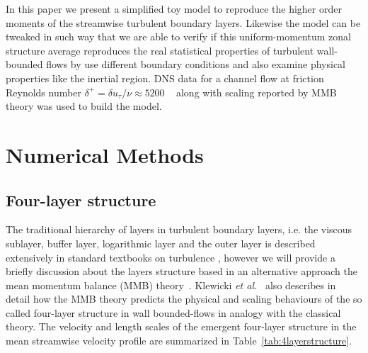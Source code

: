 \documentclass[aps,reprint,amsmath,amssymb,pra]{revtex4-1}%
\begin{document}
In this paper we present a simplified toy model to reproduce the higher order moments of the streamwise turbulent boundary layers. Likewise the model can be tweaked in such way that we are able to verify if this uniform-momentum zonal structure average reproduces the real statistical properties of turbulent wall-bounded flows by use different boundary conditions  and also examine physical properties like the inertial region.  DNS data for a channel flow at friction Reynolds number $\delta^+=\delta u_{\tau}/\nu\approx 5200$ ~\cite{leemoser2015}  along with scaling reported by MMB theory was used to build the model. 

\section{\label{sec:nm} Numerical Methods}
\subsection{Four-layer structure\label{subsec:4ls}}
The traditional hierarchy of layers in turbulent boundary layers, i.e. the viscous sublayer, buffer layer, logarithmic layer and the outer layer is described extensively in standard textbooks on turbulence \cite{tenelumley,pa,mathieu}, however we will provide a briefly discussion about the layers structure based in an alternative approach the mean momentum balance (MMB) theory~\citep{wei2005,fife2005}. Klewicki \textit{et al.}~\citep{Klewickimmb} also describes in detail how the MMB theory predicts the physical and scaling behaviours of the so called four-layer structure in wall bounded-flows in analogy with the classical theory.  The velocity and  length scales of the emergent four-layer structure in the mean streamwise velocity profile are summarized in Table~\ref{tab:4layerstructure}.
\end{document}

